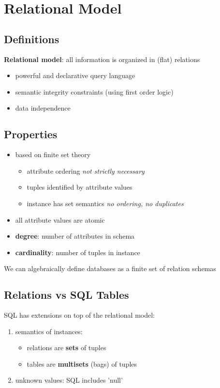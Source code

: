 \documentclass[]{article}
\theoremstyle{definition}
\begin{document}
				
	\section{Relational Model}
		\subsection{Definitions}
			\textbf{Relational model}: all information is organized in (flat) relations
			\begin{itemize}
				\item powerful and declarative query language
				\item semantic integrity constraints (using first order logic)
				\item data independence
			\end{itemize}	
		\subsection{Properties}
			\begin{itemize}
				\item based on finite set theory
					\begin{itemize}
						\item attribute ordering \textit{not strictly necessary}
						\item tuples identified by attribute values
						\item instance has set semantics \textit{no ordering, no duplicates}
					\end{itemize}
				\item all attribute values are atomic 
				\item \textbf{degree}: number of attributes in schema
				\item \textbf{cardinality}: number of tuples in instance
			\end{itemize}			 			
				
			We can algebraically define databases as a finite set of relation schemas
		\subsection{Relations vs SQL Tables}
			SQL has extensions on top of the relational model:
			\begin{enumerate}
				\item semantics of instances:
					\begin{itemize}
						\item relations are \textbf{sets} of tuples
						\item tables are \textbf{multisets} (bags) of tuples 
					\end{itemize}
				\item unknown values: SQL includes 'null'
			\end{enumerate}										
	
\end{document}
